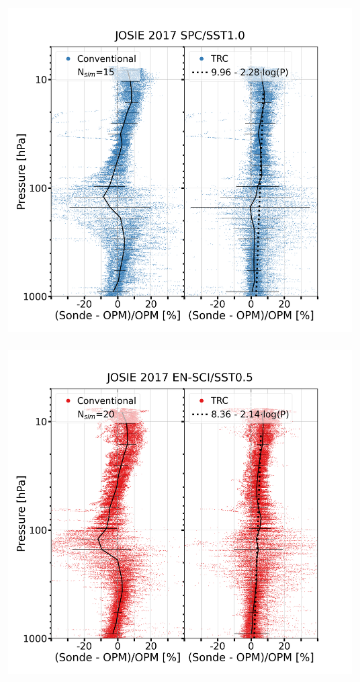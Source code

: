 \documentclass{article}
\begin{document}
\begin{figure}

\centering
\begin{subfigure}{0.48\textwidth}
    \includegraphics[height = 0.45\textheight,width=\textwidth ]{png/scatter_2017_SPC1010_pressure}
\end{subfigure}
\hspace{0.01mm}
\begin{subfigure}{0.48\textwidth}
    \includegraphics[width=\textwidth]{png/scatter_2017_EN0505_pressure}
\end{subfigure}
\hspace{5mm}


\end{figure}
\end{document}
